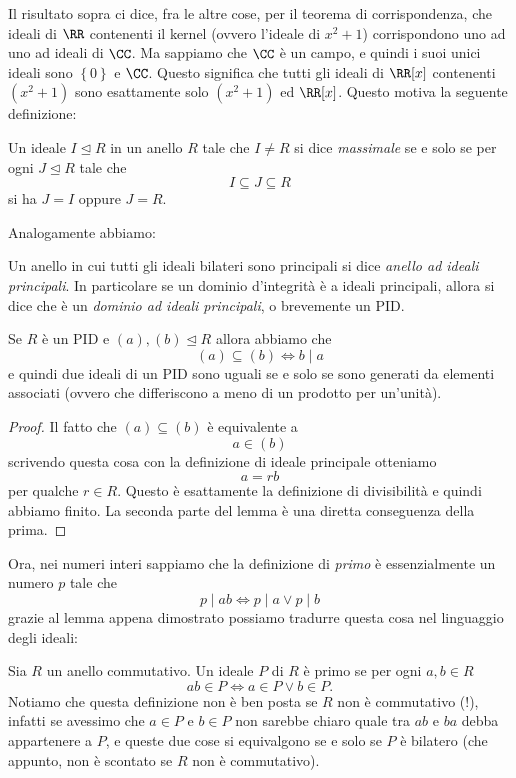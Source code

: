 \documentclass[11pt]{scrartcl}
\newcommand{\normal}{\mathrel{\unlhd}}
\begin{document}
	Il risultato sopra ci dice, fra le altre cose, per il teorema di corrispondenza, che ideali di $\RR$ contenenti il kernel (ovvero l'ideale di $x^2+1$) corrispondono uno ad uno ad ideali di $\CC$. Ma sappiamo che $\CC$ è un campo, e quindi i suoi unici ideali sono $\left\{0\right\}$ e $\CC$. Questo significa che tutti gli ideali di $\RR[x]$ contenenti $(x^2+1)$ sono esattamente solo $(x^2+1)$ ed $\RR[x]$. Questo motiva la seguente definizione:
	\begin{definition}
		Un ideale $I\normal R$ in un anello $R$ tale che $I\ne R$ si dice \textit{massimale} se e solo se per ogni $J\normal R$ tale che 
		$$I\subseteq J \subseteq R$$
		si ha $J=I$ oppure $J=R$.
	\end{definition}
	Analogamente abbiamo:
	\begin{definition}[PID]
		Un anello in cui tutti gli ideali bilateri sono principali si dice \textit{anello ad ideali principali}. In particolare se un dominio d'integrità è a ideali principali, allora si dice che è un \textit{dominio ad ideali principali}, o brevemente un PID.
	\end{definition}
	\begin{lemma}
		Se $R$ è un PID e $(a),(b)\normal R$ allora abbiamo che 
		$$(a)\subseteq (b)\iff b\mid a$$ 
		e quindi due ideali di un PID sono uguali se e solo se sono generati da elementi associati (ovvero che differiscono a meno di un prodotto per un'unità).
	\end{lemma}
	\begin{proof}
		Il fatto che $(a)\subseteq (b)$ è equivalente a 
		$$a\in (b)$$
		scrivendo questa cosa con la definizione di ideale principale otteniamo
		$$a=rb$$
		per qualche $r\in R$. Questo è esattamente la definizione di divisibilità e quindi abbiamo finito. La seconda parte del lemma è una diretta conseguenza della prima.
	\end{proof}
	Ora, nei numeri interi sappiamo che la definizione di \textit{primo} è essenzialmente un numero $p$ tale che
	$$p\mid ab 	\iff p\mid a \lor p\mid b$$
	grazie al lemma appena dimostrato possiamo tradurre questa cosa nel linguaggio degli ideali:
	\begin{definition}
		Sia $R$ un anello commutativo. Un ideale $P$ di $R$ è primo se per ogni $a,b\in R$ 
		$$ab\in P \iff a\in P \lor b\in P.$$
		Notiamo che questa definizione non è ben posta se $R$ non è commutativo (!), infatti se avessimo che $a\in P$ e $b\in P$ non sarebbe chiaro quale tra $ab$ e $ba$ debba appartenere a $P$, e queste due cose si equivalgono se e solo se $P$ è bilatero (che appunto, non è scontato se $R$ non è commutativo). 
	\end{definition}
\end{document}
